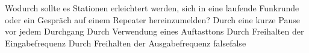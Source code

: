    {Wodurch sollte es Stationen erleichtert werden, sich in eine laufende Funkrunde oder ein Gespräch auf einem Repeater hereinzumelden?}
    {Durch eine kurze Pause vor jedem Durchgang}
    {Durch Verwendung eines Auftasttons}
    {Durch Freihalten der Eingabefrequenz}
    {Durch Freihalten der Ausgabefrequenz}
    {false}{false}
